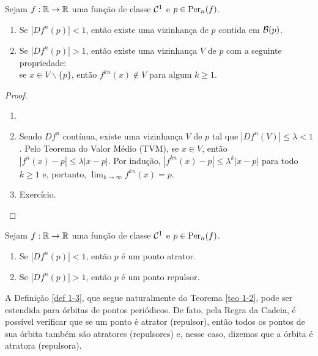 \begin{theorem}\label{teo 1-2}
Sejam $f: \mathbb{R} \to \mathbb{R}$ uma função de classe $\mathcal{C}^1$ e $p \in \operatorname{Per}_n(f)$.
\begin{enumerate}
\item Se $|D f^n(p)| < 1$, então existe uma vizinhança de $p$ contida em $\mathcal{B}(p)$.
\item Se $|D f^n(p)| > 1$, então existe uma vizinhança $V$ de $p$ com a seguinte propriedade:\\se $x \in V \backslash \lbrace p \rbrace$, então  $f^{kn}(x) \notin V$ para algum $k \geq 1$. 
\end{enumerate}
\end{theorem}

\begin{proof}
\begin{enumerate}\item[]
\item Sendo $D f^n$ contínua, existe uma vizinhança $V$ de $p$ tal que $|D f^n(V)| \leq \lambda < 1$.
Pelo Teorema do Valor Médio (TVM), se $x \in V$, então $|f^n(x) - p| \leq \lambda|x - p|$.
Por indução, $|f^{kn}(x) - p| \leq \lambda^k|x - p|$ para todo $k \geq 1$ e, portanto, $\lim_{k \to \infty} f^{kn}(x) = p$.
\item Exercício.
\end{enumerate}
\end{proof}



\begin{definition}\label{def 1-3}
Sejam $f: \mathbb{R} \to \mathbb{R}$ uma função de classe $\mathcal{C}^1$ e $p \in \operatorname{Per}_n(f)$.
\begin{enumerate}[label=\roman*.]
\item Se $|D f^n(p)| < 1$, então $p$ é um ponto atrator.
\item Se $|D f^n(p)| > 1$, então $p$ é um ponto repulsor.
\end{enumerate}
\end{definition}

A Definição \ref{def 1-3}, que segue naturalmente do Teorema \ref{teo 1-2}, pode ser estendida para órbitas de pontos periódicos. De fato, pela Regra da Cadeia, é possível verificar que se um ponto é atrator (repulsor), então todos os pontos de sua órbita também são atratores (repulsores) e, nesse caso, dizemos que a órbita é atratora (repulsora).
